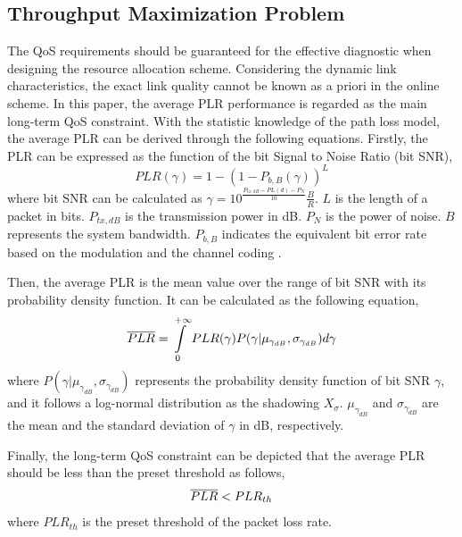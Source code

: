 \documentclass[journal,10pt]{IEEEtran}
\begin{document}
\subsection{Throughput Maximization Problem}
The QoS requirements should be guaranteed for the effective diagnostic when designing the resource allocation scheme. Considering the dynamic link characteristics, the exact link quality cannot be known as a priori in the online scheme. In this paper, the average PLR performance is regarded as the main long-term QoS constraint. With the statistic knowledge of the path loss model, the average PLR can be derived through the following equations.
Firstly, the PLR can be expressed as the function of the bit Signal to Noise Ratio (bit SNR),
\begin{equation}
PLR({\gamma }) = 1 - {\left( {1 - {P_{b,B}}({\gamma })} \right)^L}
\end{equation}
where bit SNR can be calculated as ${\gamma } =  {10^{\frac{{{P_{tx,dB}} - PL\left( d \right) - {P_{N}}}}{{10}}}} \frac{B}{R}$. $L$ is the length of a packet in bits. $P_{tx,dB}$ is the transmission power in dB. $P_{N}$ is the power of noise. $B$ represents the system bandwidth. $P_{b,B}$ indicates the equivalent bit error rate based on the modulation and the channel coding \cite{goldsmith2005wireless}. 

Then, the average PLR is the mean value over the range of bit SNR with its probability density function. It can be calculated as the following equation,
\begin{equation} \footnotesize
\overline{PLR}  = \int\limits_0^{ + \infty } {PLR({\gamma})} P({\gamma}|{\mu _{{\gamma _{dB}}}},{\sigma _{{\gamma _{dB}}}})d{\gamma }
\end{equation}
where $P({\gamma}|{\mu _{{\gamma _{dB}}}},{\sigma _{{\gamma _{dB}}}})$ represents the probability density function of bit SNR $\gamma$, and it follows a log-normal distribution as the shadowing $X_{\sigma}$. $\mu _{{\gamma _{dB}}}$ and ${\sigma _{{\gamma _{dB}}}}$ are the mean and the standard deviation of $\gamma$ in dB, respectively. 

Finally, the long-term QoS constraint can be depicted that the average PLR should be less than the preset threshold as follows,
\begin{equation}  \small
\overline{PLR} < PLR_{th}
\end{equation}
where $PLR_{th}$ is the preset threshold of the packet loss rate.
\end{document}

